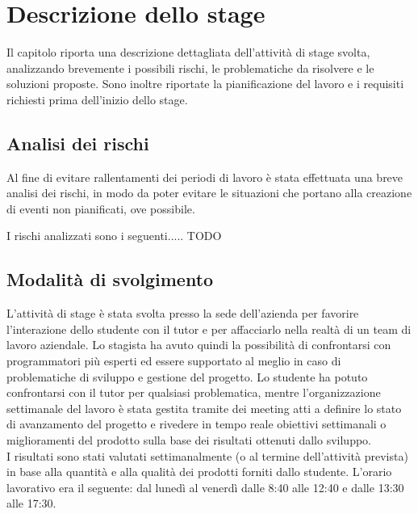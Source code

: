 
\chapter{Descrizione dello stage}
\label{cap:descrizione-stage}

Il capitolo riporta una descrizione dettagliata dell'attività di stage svolta, analizzando brevemente i possibili rischi, le problematiche da risolvere e le soluzioni proposte. Sono inoltre riportate la pianificazione del lavoro e i requisiti richiesti prima dell'inizio dello stage. 

\section{Analisi dei rischi}

Al fine di evitare rallentamenti dei periodi di lavoro è stata effettuata una breve analisi dei
rischi, in modo da poter evitare le situazioni che portano alla creazione di eventi non pianificati,
ove possibile. 

I rischi analizzati sono i seguenti..... TODO

\section{Modalità di svolgimento}
L’attività di stage è stata svolta presso la sede dell’azienda per favorire l’interazione dello studente con il tutor e per affacciarlo nella realtà di un team di lavoro aziendale. Lo stagista ha avuto quindi la possibilità di confrontarsi con programmatori più esperti ed essere supportato al meglio in caso di problematiche di sviluppo e gestione del progetto.
Lo studente ha potuto confrontarsi con il tutor per qualsiasi problematica, mentre l’organizzazione settimanale del lavoro è stata gestita tramite dei meeting atti a definire lo stato di avanzamento del progetto e rivedere in tempo reale obiettivi settimanali o miglioramenti del prodotto sulla base dei risultati ottenuti dallo sviluppo.\\ I risultati sono stati valutati settimanalmente (o al termine dell’attività prevista) in base alla quantità e alla qualità dei prodotti forniti dallo studente.
L’orario lavorativo era il seguente: dal lunedì al venerdì dalle 8:40 alle 12:40 e dalle 13:30 alle 17:30.

